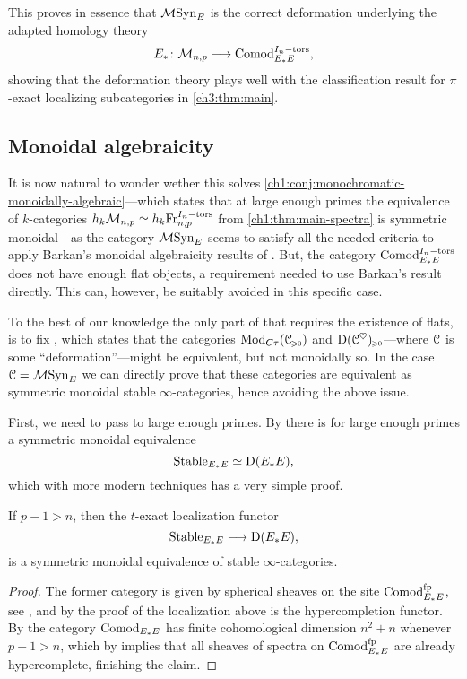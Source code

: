 This proves in essence that $\mathcal{M}\mathrm{Syn}_{E}$ is the correct deformation underlying the adapted homology theory 
\[E_*\colon \mathcal{M}_{n,p} \longrightarrow \mathrm{Comod}_{E_*E}^{I_n-\mathrm{tors}},\] 
showing that the deformation theory plays well with the classification result for $\pi$-exact localizing subcategories in \cref{ch3:thm:main}. 

\subsection{Monoidal algebraicity}

It is now natural to wonder wether this solves \cref{ch1:conj:monochromatic-monoidally-algebraic}---which states that at large enough primes the equivalence of $k$-categories $h_k\mathcal{M}_{n,p} \simeq h_k\mathrm{Fr}_{n,p}^{I_n-\mathrm{tors}}$ from \cref{ch1:thm:main-spectra} is symmetric monoidal---as the category $\mathcal{M}\mathrm{Syn}_{E}$ seems to satisfy all the needed criteria to apply Barkan's monoidal algebraicity results of \cite{barkan_2023}. But, the category $\mathrm{Comod}_{E_*E}^{I_n-\mathrm{tors}}$ does not have enough flat objects, a requirement needed to use Barkan's result directly. This can, however, be suitably avoided in this specific case. 

To the best of our knowledge the only part of \cite[Theorem H]{barkan_2023} that requires the existence of flats, is to fix \cite[Warning 3..30]{barkan_2023}, which states that the categories $\mathrm{Mod}_{C\tau}(\EuScript{C}_{\hspace{-1pt}\scriptscriptstyle\geqslant 0})$ and $\mathrm{D}(\EuScript{C}^\heartsuit)_{\hspace{-1pt}\scriptscriptstyle\geqslant 0}$---where $\EuScript{C}$ is some ``deformation''---might be equivalent, but not monoidally so. In the case $\EuScript{C}= \mathcal{M}\mathrm{Syn}_{E}$ we can directly prove that these categories are equivalent as symmetric monoidal stable $\infty$-categories, hence avoiding the above issue. 

First, we need to pass to large enough primes. By \cite[4.11]{barthel-heard_2018} there is for large enough primes a symmetric monoidal equivalence
\[\mathrm{Stable}_{E_*E} \simeq \mathrm{D}(E_*E),\]
which with more modern techniques has a very simple proof. 

\begin{lemma}
    \label{ch3:add:cor:hypercomplete-at-large-primes}
    If $p-1>n$, then the $t$-exact localization functor
    \[\mathrm{Stable}_{E_*E} \longrightarrow \mathrm{D}(E_*E),\]
    is a symmetric monoidal equivalence of stable $\infty$-categories.  
\end{lemma}
\begin{proof}
    The former category is given by spherical sheaves on the site $\mathrm{Comod}_{E_*E}^{\mathrm{fp}}$, see \cite[3.7]{pstragowski_2022}, and by the proof of \cite[4.54]{pstragowski_2022} the localization above is the hypercompletion functor. By \cite[2.5]{pstragowski_2021} the category $\mathrm{Comod}_{E_*E}$ has finite cohomological dimension $n^2+n$ whenever $p-1>n$, which by \cite[2.10]{clausen-mathew_2021} implies that all sheaves of spectra on $\mathrm{Comod}_{E_*E}^{\mathrm{fp}}$ are already hypercomplete, finishing the claim. 
\end{proof}

